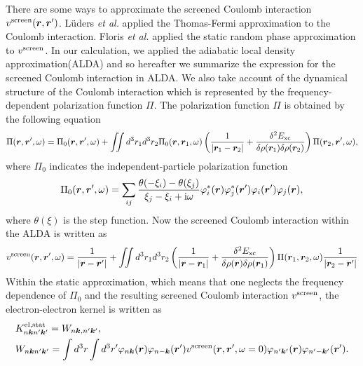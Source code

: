 There are some ways to approximate the screened Coulomb interaction $v^{\rm screen}(\bm r, \bm r')$. 
L\"{u}ders {\it et al.} applied the Thomas-Fermi approximation to the Coulomb interaction\cite{Luders2005}.
Floris {\it et al.}\cite{Floris2007,Floris2007physica} applied the static random phase approximation to $v^{\rm screen}$.
In our calculation, we applied the adiabatic local density approximation(ALDA)\cite{Zangwill1980} and 
so hereafter we summarize the expression for the screened Coulomb interaction in ALDA.
We also take account of the dynamical structure of the Coulomb interaction which is represented by
the frequency-dependent polarization function $\Pi$.
The polarization function $\Pi$ is obtained by the following equation
%
\begin{equation}
	\Pi(\bm r, \bm r', \omega) = \Pi_0(\bm r, \bm r', \omega) + 
	\iint d^3r_1d^3r_2\Pi_0(\bm r, \bm r_1, \omega) 
	\left(
	\frac{1}{|\bm r_1 - \bm r_2|} + \frac{\delta^2E_{\rm xc}}{\delta\rho(\bm r_1)\delta\rho(\bm r_2)}
	\right)
	\Pi(\bm r_2, \bm r', \omega), 
	\label{eq:Pieq}
\end{equation}
%
where $\Pi_0$ indicates the independent-particle polarization function
%
\begin{equation}
	\Pi_0(\bm r, \bm r', \omega) = \sum_{ij}
	\frac{\theta(-\xi_i)-\theta(\xi_j)}{\xi_j-\xi_i+{\rm i}\omega}
	\varphi^\ast_i(\bm r)\varphi^\ast_j(\bm r')\varphi_i(\bm r')\varphi_j(\bm r),
	\label{eq:chi0}
\end{equation}
%
where $\theta(\xi)$ is the step function.
Now the screened Coulomb interaction within the ALDA is written as
%
\begin{equation}
	v^{\rm screen}(\bm r, \bm r', \omega) = \frac{1}{|\bm r - \bm r'|} + 
	\iint d^3r_1 d^3r_2 
	\left(
	\frac{1}{|\bm r - \bm r_1|} + \frac{\delta^2E_{\rm xc}}{\delta\rho(\bm r)\delta\rho(\bm r_1)}
	\right)
	\Pi(\bm r_1, \bm r_2, \omega) \frac{1}{|\bm r_2 - \bm r'|}
	\label{eq:vscr}
\end{equation}
%
Within the static approximation, which means that one neglects the frequency dependence of $\Pi_0$ 
and the resulting screened Coulomb interaction $v^{\rm screen}$, the electron-electron kernel
is written as 
%
\begin{equation}
	\begin{split}
	& K^{\rm el, stat}_{n\bm kn' \bm k'} = W_{n \bm k, n' \bm k'}, \\
	& W_{n\bm kn'\bm k'} = 
	\int d^3r \int d^3r' \varphi_{n\bm k}(\bm r)\varphi_{n-\bm k}({\bm r'})
	v^{\rm screen}(\bm r, {\bm r'},\omega=0) \varphi_{n'\bm k'}(\bm r) \varphi_{n'-\bm k'}({\bm r'}).
	\label{eq:Kelstat}
\end{split}
\end{equation}
